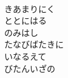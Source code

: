 \documentclass[10pt,b5j]{tarticle} %
\begin{document}
\begin{enumerate}
\begin{minipage}[c]{\blocksize}
        \vspace{\linespace}
        \item~\\
        きあまりにく\\
        ととにはる\\
        のみはし\\
        たなびばたきに\\
        いなるえて\\
        びたんいざの
    
    \end{minipage}
\end{enumerate} %
\end{document}
